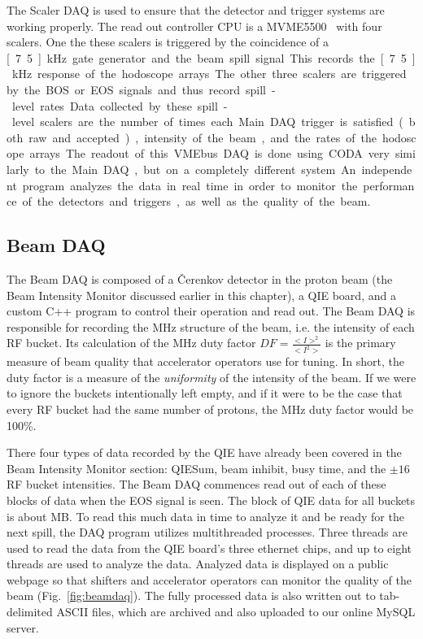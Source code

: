 The Scaler DAQ is used to ensure that the detector and trigger systems are working properly. The read out controller CPU is a MVME5500~\cite{mvme:scaler} with four scalers. One the these scalers is triggered by the coincidence of a \unit[7.5]{kHz} gate generator and the beam spill signal. This records the \unit[7.5]{kHz} response of the hodoscope arrays. The other three scalers are triggered by the BOS or EOS signals and thus record spill-level rates. Data collected by these spill-level scalers are the number of times each Main DAQ trigger is satisfied (both raw and accepted), intensity of the beam, and the rates of the hodoscope arrays. The readout of this VMEbus DAQ is done using CODA very similarly to the Main DAQ, but on a completely different system. An independent program analyzes the data in real time in order to monitor the performance of the detectors and triggers, as well as the quality of the beam. 


\subsection{Beam DAQ}

The Beam DAQ is composed of a \v{C}erenkov detector in the proton beam (the Beam Intensity Monitor discussed earlier in this chapter), a QIE board, and a custom C++ program to control their operation and read out. The Beam DAQ is responsible for recording the \unit[53]{MHz} structure of the beam, i.e. the intensity of each RF bucket. Its calculation of the \unit[53]{MHz} duty factor $DF=\frac{<I>^{2}}{<I^{2}>}$ is the primary measure of beam quality that accelerator operators use for tuning. In short, the duty factor is a measure of the \emph{uniformity} of the intensity of the beam. If we were to ignore the buckets intentionally left empty, and if it were to be the case that every RF bucket had the same number of protons, the \unit[53]{MHz} duty factor would be 100\%.

There four types of data recorded by the QIE have already been covered in the Beam Intensity Monitor section: QIESum, beam inhibit, busy time, and the $\pm16$ RF bucket intensities. The Beam DAQ commences read out of each of these blocks of data when the EOS signal is seen. The block of QIE data for all buckets is about \unit[300]{MB}. To read this much data in time to analyze it and be ready for the next spill, the DAQ program utilizes multithreaded processes. Three threads are used to read the data from the QIE board's three ethernet chips, and up to eight threads are used to analyze the data. Analyzed data is displayed on a public webpage so that shifters and accelerator operators can monitor the quality of the beam (Fig.~\ref{fig:beamdaq}). The fully processed data is also written out to tab-delimited ASCII files, which are archived and also uploaded to our online MySQL server.

